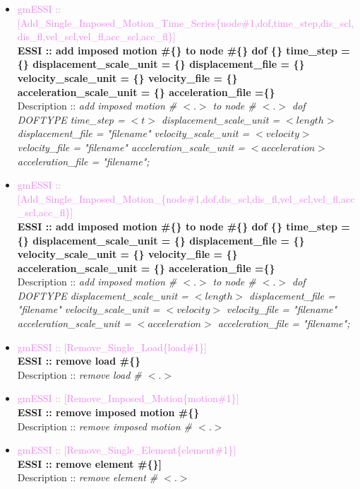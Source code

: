 \documentclass[11pt]{article}
\begin{document}
\begin{itemize}
        \item \textcolor{violet} {gmESSI :: [Add\_Single\_Imposed\_Motion\_Time\_Series\{node\#1,dof,time\_step,dis\_scl,dis\_fl,vel\_scl,vel\_fl,acc\_scl,acc\_fl\}]}\\
        \textbf{ESSI :: add imposed motion \#\{\} to node \#\{\} dof \{\} time\_step = \{\} displacement\_scale\_unit = \{\} displacement\_file = \{\} velocity\_scale\_unit = \{\} velocity\_file = \{\} acceleration\_scale\_unit = \{\} acceleration\_file =\{\}}\\
        Description :: \textit{add imposed motion \# $<.>$ to node \# $<.>$ dof DOFTYPE time\_step = $<t>$ displacement\_scale\_unit = $<length>$ displacement\_file = "filename" velocity\_scale\_unit = $<velocity>$ velocity\_file = "filename" acceleration\_scale\_unit = $<acceleration>$ acceleration\_file = "filename";}

        \item \textcolor{violet} {gmESSI :: [Add\_Single\_Imposed\_Motion_\{node\#1,dof,dis\_scl,dis\_fl,vel\_scl,vel\_fl,acc\_scl,acc\_fl\}]}\\
        \textbf{ESSI :: add imposed motion \#\{\} to node \#\{\} dof \{\} time\_step = \{\} displacement\_scale\_unit = \{\} displacement\_file = \{\} velocity\_scale\_unit = \{\} velocity\_file = \{\} acceleration\_scale\_unit = \{\} acceleration\_file =\{\}}\\
        Description :: \textit{add imposed motion \# $<.>$ to node \# $<.>$ dof DOFTYPE displacement\_scale\_unit = $<length>$ displacement\_file = "filename" velocity\_scale\_unit = $<velocity>$ velocity\_file = "filename" acceleration\_scale\_unit = $<acceleration>$ acceleration\_file = "filename";}

        \item \textcolor{violet} {gmESSI :: [Remove\_Single\_Load\{load\#1\}]}\\
        \textbf{ESSI :: remove load \#\{\}}\\
        Description :: \textit{remove load \# $<.>$}

        \item \textcolor{violet} {gmESSI :: [Remove\_Imposed\_Motion\{motion\#1\}]}\\
        \textbf{ESSI :: remove imposed motion \#\{\}}\\
        Description :: \textit{remove imposed motion \# $<.>$}

        \item \textcolor{violet} {gmESSI :: [Remove\_Single\_Element\{element\#1\}]}\\
        \textbf{ESSI :: remove element \#\{\}]}\\
        Description :: \textit{remove element \# $<.>$}


\end{itemize}
\end{document}
